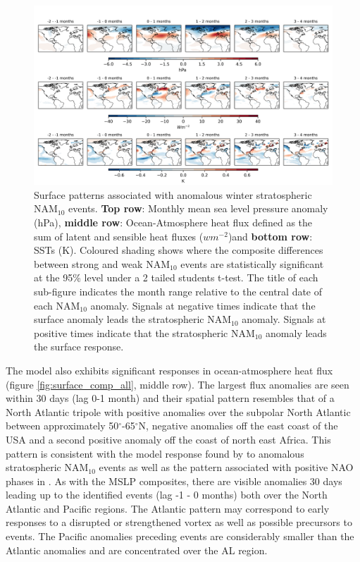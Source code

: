 \begin{center}
\begin{figure}[h!]
\noindent\includegraphics[width = \linewidth]{Figures/Figures-surface/in_season_response_NAM_combined.png}
\caption{Surface patterns associated with anomalous winter stratospheric NAM$_{10}$ events. \textbf{Top row}: Monthly mean sea level pressure anomaly (hPa), \textbf{middle row}: Ocean-Atmosphere heat flux defined as the sum of latent and sensible heat fluxes ($wm^{-2}$)and \textbf{bottom row}: SSTs (K). Coloured shading shows where the composite differences between strong and weak NAM$_{10}$ events are statistically significant at the 95\% level under a 2 tailed students t-test. The title of each sub-figure indicates the month range relative to the central date of each NAM$_{10}$ anomaly. Signals at negative times indicate that the surface anomaly leads the stratospheric NAM$_{10}$ anomaly. Signals at positive  times indicate that the stratospheric NAM$_{10}$ anomaly leads the surface response.}
\label{surface_comp_all}
\end{figure}
\end{center}

The model also exhibits significant responses in ocean-atmosphere heat flux (figure \ref{fig:surface_comp_all}, middle row). The largest flux anomalies are seen within 30 days (lag 0-1 month) and their spatial pattern resembles that of a North Atlantic tripole with positive anomalies over the subpolar North Atlantic between approximately 50$^\circ$-65$^\circ$N, negative anomalies off the east coast of the USA and a second positive anomaly off the coast of north east Africa. This pattern is consistent with the model response found by \cite{reichlerStratospheric2012b} to anomalous stratospheric NAM$_{10}$ events as well as the pattern associated with positive NAO phases in \cite{delworthImpact2016c}. As with the MSLP composites, there are visible anomalies 30 days leading up to the identified events (lag -1 - 0 months) both over the North Atlantic and Pacific regions. The Atlantic pattern may correspond to early responses to a disrupted or strengthened vortex as well as possible precursors to events. The Pacific anomalies preceding events are considerably smaller than the Atlantic anomalies and are concentrated over the AL region.

